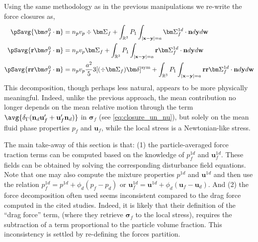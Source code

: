 Using the same methodology as in the previous manipulations we re-write the force closures as, 
\begin{align}
    \pSavg{\bm\sigma_f^0\cdot\textbf{n}}
    &=
    n_p v_p 
    \div\bm\Sigma_f
    +
    \int_{\mathbb{R}^3}
    P_1
    \int_{|\textbf{x}-\textbf{y}|=a}
    \bm\Sigma_f^{1d} \cdot \textbf{n}
    d\textbf{y}d\textbf{w}
    \label{eq:drag_final2}\\
    \pSavg{\textbf{r}\bm\sigma_f^0\cdot\textbf{n}}
    &=
    n_p v_p \bm\Sigma_f
    +
    \int_{\mathbb{R}^3}
    P_1
    \int_{|\textbf{x}-\textbf{y}|=a}
    \textbf{r}\bm\Sigma_f^{1d} \cdot \textbf{n}
    d\textbf{y}
    d\textbf{w}
    \\
    \pSavg{\textbf{rr}\bm\sigma_f^0\cdot\textbf{n}}
    &=
    n_pv_p  \frac{a^2}{5} 3 [(\div \bm\Sigma_f)\bm\delta]^\text{sym}
    +
    \int_{\mathbb{R}^3}
    P_1
    \int_{|\textbf{x}-\textbf{y}|=a}
    \textbf{rr}\bm\Sigma_f^{1d} \cdot \textbf{n}
    d\textbf{y}
    d\textbf{w}
    \label{eq:second_mom_general2}
\end{align}
This decomposition, though perhaps less natural, appears to be more physically meaningful. 
Indeed, unlike the previous approach, the mean contribution no longer depends on the mean relative motion through the term $\avg{\delta_\Gamma (\textbf{n}_d \textbf{u}_f'+  \textbf{u}_f' \textbf{n}_d)}$ in $\bm\sigma_f$ (see \ref{eq:closure_un_nu}), but solely on the mean fluid phase properties $p_f$ and $\textbf{u}_f$, while the local stress is a Newtonian-like stress.  

The main take-away of this section is that: (1)  the particle-averaged force traction terms can be computed based on the knowledge of $p_f^{1d}$ and $\textbf{u}_f^{1d}$. 
These fields can be obtained by solving the corresponding disturbance field equations. 
Note that one may also compute the mixture properties $p^{1d}$ and $\textbf{u}^{1d}$ and then use the relation $p_f^{1d} = p^{1d} + \phi_d (p_f - p_d)$ or $\textbf{u}_f^{1d} = \textbf{u}^{1d} + \phi_d (\textbf{u}_f - \textbf{u}_d)$. 
And (2) the force decomposition often used \citep{jackson2000,zhang1997momentum,wang2021numerical,wang2024effect} seems inconsistent compared to the drag force computed in the cited studies.
Indeed, it is likely that their definition of the ``drag force'' term, (where they retrieve $\bm\sigma_f$ to the local stress), requires the subtraction of a term proportional to the particle volume fraction. 
This inconsistency is settled by re-defining the forces partition.  

